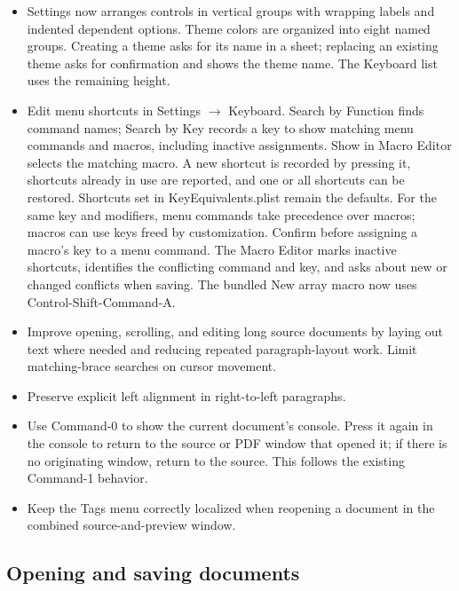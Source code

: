 \documentclass[11pt,letterpaper]{article}
\begin{document}
\begin{itemize}
\item Settings now arranges controls in vertical groups with wrapping labels and indented dependent options. Theme colors are organized into eight named groups. Creating a theme asks for its name in a sheet; replacing an existing theme asks for confirmation and shows the theme name. The Keyboard list uses the remaining height.
\item Edit menu shortcuts in Settings \(\rightarrow\) Keyboard. Search by Function finds command names; Search by Key records a key to show matching menu commands and macros, including inactive assignments. Show in Macro Editor selects the matching macro. A new shortcut is recorded by pressing it, shortcuts already in use are reported, and one or all shortcuts can be restored. Shortcuts set in KeyEquivalents.plist remain the defaults. For the same key and modifiers, menu commands take precedence over macros; macros can use keys freed by customization. Confirm before assigning a macro’s key to a menu command. The Macro Editor marks inactive shortcuts, identifies the conflicting command and key, and asks about new or changed conflicts when saving. The bundled New array macro now uses Control-Shift-Command-A.
\item Improve opening, scrolling, and editing long source documents by laying out text where needed and reducing repeated paragraph-layout work. Limit matching-brace searches on cursor movement.
\item Preserve explicit left alignment in right-to-left paragraphs.
\item Use Command-0 to show the current document’s console. Press it again in the console to return to the source or PDF window that opened it; if there is no originating window, return to the source. This follows the existing Command-1 behavior.
\item Keep the Tags menu correctly localized when reopening a document in the combined source-and-preview window.
\end{itemize}

\subsection{Opening and saving documents}
\end{document}
